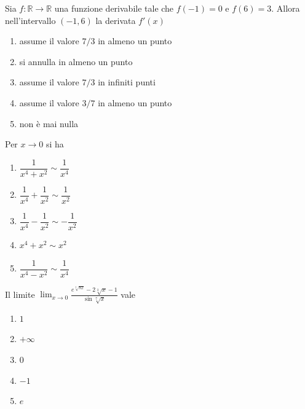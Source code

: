\begin{quiz}
Sia $f:\mathbb R\to\mathbb R$ una funzione derivabile tale che $f(-1)=0$ e $f(6)=3$. Allora nell'intervallo $(-1,6)$ la derivata $f'(x)$
\begin{enumerate}
\item assume il valore $7/3$ in almeno un punto
\item si annulla in almeno un punto
\item assume il valore $7/3$ in infiniti punti
\item assume il valore $3/7$ in almeno un punto
\item non \`e mai nulla
\end{enumerate}
\end{quiz}

\begin{quiz}
Per $x\to0$ si ha
\begin{enumerate}
\item $\dfrac1{x^4+x^2}\sim\dfrac1{x^4}$
\item $\dfrac1{x^4}+\dfrac1{x^2}\sim\dfrac1{x^2}$
\item $\dfrac1{x^4}-\dfrac1{x^2}\sim-\dfrac1{x^2}$
\item $x^4+x^2\sim x^2$
\item $\dfrac1{x^4-x^2}\sim\dfrac1{x^4}$
\end{enumerate}
\end{quiz}

\begin{quiz}
Il limite $\displaystyle\lim_{x\to0}\frac{e^{\sqrt[3]{8x}}-2\sqrt[3]{x}-1}{\sin\sqrt[7]{x}}$ vale
\begin{enumerate}
\item $1$
\item $+\infty$
\item $0$
\item $-1$
\item $e$
\end{enumerate}
\end{quiz}

